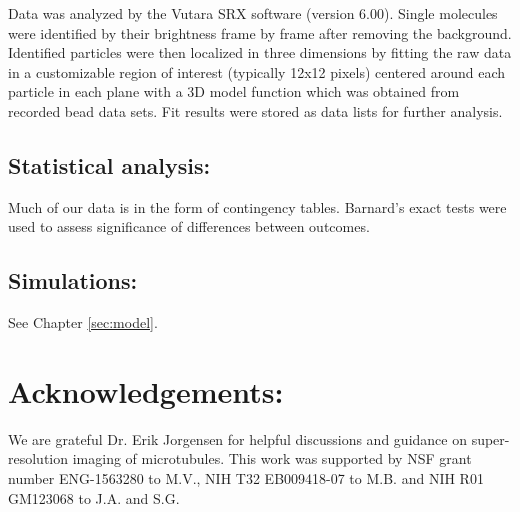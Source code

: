 Data was analyzed by the Vutara SRX software (version 6.00). Single molecules were identified by their brightness frame by frame after removing the background. Identified particles were then localized in three dimensions by fitting the raw data in a customizable region of interest (typically 12x12 pixels) centered around each particle in each plane with a 3D model function which was obtained from recorded bead data sets. Fit results were stored as data lists for further analysis.

\subsection{Statistical analysis:}

Much of our data is in the form of contingency tables. Barnard's exact tests were used to assess significance of differences between outcomes.

\subsection{Simulations:}

See Chapter \ref{sec:model}.

\section{Acknowledgements:}

We are grateful Dr. Erik Jorgensen for helpful discussions and guidance on super-resolution imaging of microtubules. This work was supported by NSF grant number ENG-1563280 to M.V., NIH T32 EB009418-07 to M.B. and NIH R01 GM123068 to J.A. and S.G.